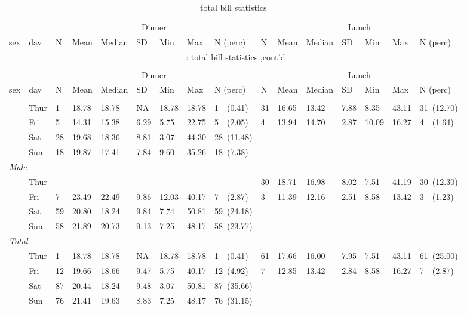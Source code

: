 \documentclass{article}
\begin{document}
\hypertarget{total bill statistics}{} 
\begin{longtable}{llllllllllllllll}
\caption{total bill statistics}\\
\toprule
&&
\multicolumn{7}{c}{Dinner}&\multicolumn{7}{c}{Lunch} \\
\cmidrule(lr){3-9} \cmidrule(lr){10-16}
sex & day & N & Mean & Median & SD & Min & Max & N (perc) & N & Mean & Median & SD & Min & Max & N (perc) \\
\hline
\endfirsthead
\multicolumn{16}{c}{\tablename~\thetable{}: total bill statistics ,cont'd}\\\\
\toprule
&&
\multicolumn{7}{c}{Dinner}&\multicolumn{7}{c}{Lunch} \\
\cmidrule(lr){3-9} \cmidrule(lr){10-16}
sex & day & N & Mean & Median & SD & Min & Max & N (perc) & N & Mean & Median & SD & Min & Max & N (perc) \\
\hline
\endhead \hline \endfoot \hline

\endlastfoot
\multicolumn{ 15 }{l}{\textit{ Female }}\\
& Thur & 1 & 18.78 & 18.78 &  NA & 18.78 & 18.78 & 1~~(0.41) & 31 & 16.65 & 13.42 & 7.88 & 8.35 & 43.11 & 31~(12.70) \\
 & Fri & 5 & 14.31 & 15.38 & 6.29 & 5.75 & 22.75 & 5~~(2.05) & 4 & 13.94 & 14.70 & 2.87 & 10.09 & 16.27 & 4~~(1.64) \\
 & Sat & 28 & 19.68 & 18.36 & 8.81 & 3.07 & 44.30 & 28~(11.48) &  &  &  &  &  &  &  \\
 & Sun & 18 & 19.87 & 17.41 & 7.84 & 9.60 & 35.26 & 18~(7.38) &  &  &  &  &  &  &  \\
\multicolumn{ 15 }{l}{\textit{ Male }}\\
& Thur &  &  &  &  &  &  &  & 30 & 18.71 & 16.98 & 8.02 & 7.51 & 41.19 & 30~(12.30) \\
 & Fri & 7 & 23.49 & 22.49 & 9.86 & 12.03 & 40.17 & 7~~(2.87) & 3 & 11.39 & 12.16 & 2.51 & 8.58 & 13.42 & 3~~(1.23) \\
 & Sat & 59 & 20.80 & 18.24 & 9.84 & 7.74 & 50.81 & 59~(24.18) &  &  &  &  &  &  &  \\
 & Sun & 58 & 21.89 & 20.73 & 9.13 & 7.25 & 48.17 & 58~(23.77) &  &  &  &  &  &  &  \\
\multicolumn{ 15 }{l}{\textit{ Total }}\\
& Thur & 1 & 18.78 & 18.78 &  NA & 18.78 & 18.78 & 1~~(0.41) & 61 & 17.66 & 16.00 & 7.95 & 7.51 & 43.11 & 61~(25.00) \\
 & Fri & 12 & 19.66 & 18.66 & 9.47 & 5.75 & 40.17 & 12~(4.92) & 7 & 12.85 & 13.42 & 2.84 & 8.58 & 16.27 & 7~~(2.87) \\
 & Sat & 87 & 20.44 & 18.24 & 9.48 & 3.07 & 50.81 & 87~(35.66) &  &  &  &  &  &  &  \\
 & Sun & 76 & 21.41 & 19.63 & 8.83 & 7.25 & 48.17 & 76~(31.15) &  &  &  &  &  &  &  \\
\end{longtable}
\end{document}
